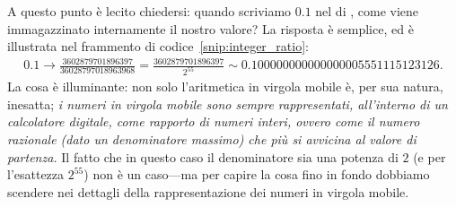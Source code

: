 
A questo punto è lecito chiedersi: quando scriviamo $0.1$ nel  di
\python, come viene immagazzinato internamente il nostro valore? La risposta
è semplice, ed è illustrata nel frammento di codice~\ref{snip:integer_ratio}:
\begin{align*}
  0.1 \rightarrow \frac{3602879701896397}{36028797018963968} =
  \frac{3602879701896397}{2^{55}} \sim 0.100000000000000005551115123126.
\end{align*}
La cosa è illuminante: non solo l'aritmetica in virgola mobile è, per sua
natura, inesatta; \emph{i numeri in virgola mobile sono sempre rappresentati,
all'interno di un calcolatore digitale, come rapporto di numeri interi, ovvero
come il numero razionale (dato un denominatore massimo) che più si avvicina al
valore di partenza.}
Il fatto che in questo caso il denominatore sia una potenza di $2$ (e per
l'esattezza $2^{55}$) non è un caso---ma per capire la cosa fino in fondo
dobbiamo scendere nei dettagli della rappresentazione dei numeri in virgola mobile.

